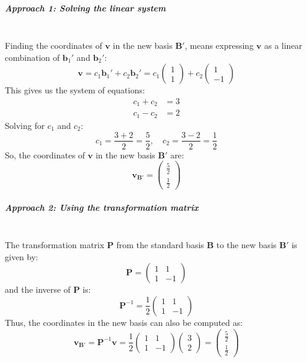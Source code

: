 \documentclass[]{article}
\begin{document}
	\subparagraph{Approach 1: Solving the linear system}
	\noindent\\
	Finding the coordinates of $\mathbf{v}$ in the new basis $\mathbf{B}'$, means expressing $\mathbf{v}$ as a linear combination of $\mathbf{b}_1'$ and $\mathbf{b}_2'$:
	$$
	\mathbf{v} = c_1 \mathbf{b}_1' + c_2 \mathbf{b}_2' = c_1 \begin{pmatrix} 1 \\ 1 \end{pmatrix} + c_2 \begin{pmatrix} 1 \\ -1 \end{pmatrix}
	$$
	This gives us the system of equations:
	$$
	\begin{aligned}
		c_1 + c_2 &= 3 \\
		c_1 - c_2 &= 2
	\end{aligned}
	$$
	Solving for $c_1$ and $c_2$:
	$$
	c_1 = \frac{3 + 2}{2} = \frac{5}{2}, \quad c_2 = \frac{3 - 2}{2} = \frac{1}{2}
	$$
	So, the coordinates of $\mathbf{v}$ in the new basis $\mathbf{B}'$ are:
	$$
	\mathbf{v}_{\mathbf{B}'} = \begin{pmatrix} \frac{5}{2} \\ \frac{1}{2} \end{pmatrix}
	$$
	
	\subparagraph{Approach 2: Using the transformation matrix}
	\noindent\\
	The transformation matrix $\mathbf{P}$ from the standard basis $\mathbf{B}$ to the new basis $\mathbf{B}'$ is given by:
	$$
	\mathbf{P} = \begin{pmatrix} 1 & 1 \\ 1 & -1 \end{pmatrix}
	$$
	and the inverse of $\mathbf{P}$ is:
	$$
	\mathbf{P}^{-1} = \frac{1}{2} \begin{pmatrix} 1 & 1 \\ 1 & -1 \end{pmatrix}
	$$
	Thus, the coordinates in the new basis can also be computed as:
	$$
	\mathbf{v}_{\mathbf{B}'} = \mathbf{P}^{-1} \mathbf{v} = \frac{1}{2} \begin{pmatrix} 1 & 1 \\ 1 & -1 \end{pmatrix} \begin{pmatrix} 3 \\ 2 \end{pmatrix} = \begin{pmatrix} \frac{5}{2} \\ \frac{1}{2} \end{pmatrix}
	$$
	
\end{document}
